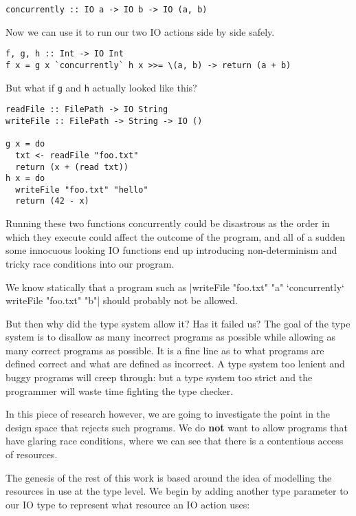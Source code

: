 \documentclass{report}
\begin{document}
\begin{verbatim}
concurrently :: IO a -> IO b -> IO (a, b)
\end{verbatim}

Now we can use it to run our two IO actions side by side safely. 
\begin{verbatim}
f, g, h :: Int -> IO Int
f x = g x `concurrently` h x >>= \(a, b) -> return (a + b)
\end{verbatim}

But what if \texttt{g} and \texttt{h} actually looked like this?

\begin{verbatim}
readFile :: FilePath -> IO String
writeFile :: FilePath -> String -> IO ()

g x = do
  txt <- readFile "foo.txt"
  return (x + (read txt))
h x = do
  writeFile "foo.txt" "hello"
  return (42 - x)
\end{verbatim}

Running these two functions concurrently could be disastrous as the order in
which they execute could affect the outcome of the program, and all of a sudden
some innocuous looking IO functions end up introducing non-determinism and
tricky race conditions into our program.

\begin{samepage}
We know statically that a program such as
|writeFile "foo.txt" "a" `concurrently` writeFile "foo.txt" "b"|
should probably not be allowed.
\end{samepage}
But then why did the type system allow it?  Has it failed us? The goal of the
type system is to disallow as many incorrect programs as possible while allowing
as many correct programs as possible. It is a fine line as to what programs are
defined correct and what are defined as incorrect. A type system too lenient and
buggy programs will creep through: but a type system too strict and the
programmer will waste time fighting the type checker.

In this piece of research however, we are going to investigate the point in the
design space that rejects such programs. We do \textbf{not} want to allow
programs that have glaring race conditions, where we can see that there is a
contentious access of resources.

The genesis of the rest of this work is based around the idea of modelling the
resources in use at the type level. We begin by adding another type parameter to
our IO type to represent what resource an IO action uses:
\end{document}
